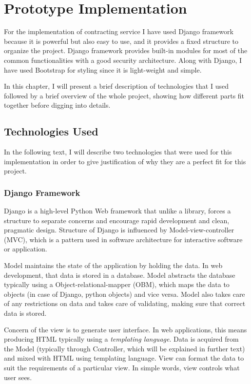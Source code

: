 \chapter{Prototype Implementation}
\label{chapter:implementation}

For the implementation of contracting service I have used Django framework because it is powerful but also easy to use, and it provides a fixed structure to organize the project. Django framework provides built-in modules for most of the common functionalities with a good security architecture. Along with Django, I have used Bootstrap for styling since it is light-weight and simple.

In this chapter, I will present a brief description of technologies that I used followed by a brief overview of the whole project, showing how different parts fit together before digging into details.

\section{Technologies Used}
\label{section:technologiesUsed}

In the following text, I will describe two technologies that were used for this implementation in order to give justification of why they are a perfect fit for this project.

\subsection{Django Framework}

Django is a high-level Python Web framework that unlike a library, forces a structure to separate concerns and encourage rapid development and clean, pragmatic design. Structure of Django is influenced by Model-view-controller (MVC), which is a pattern used in software architecture for interactive software or application. 

Model maintains the state of the application by holding the data. In web development, that data is stored in a database. Model abstracts the database typically using a Object-relational-mapper (OBM),	 which maps the data to objects (in case of Django, python objects) and vice versa. Model also takes care of any restrictions on data and takes care of validating, making sure that correct data is stored.

Concern of the view is to generate user interface. In web applications, this means producing HTML typically using a \emph{templating language}. Data is acquired from the Model (typically through Controller, which will be explained in further text) and mixed with HTML using templating language. View can format the data to suit the requirements of a particular view. In simple words, view controls what user sees.

